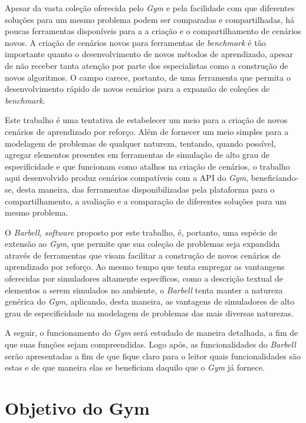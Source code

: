 \documentclass[cic,tc]{iiufrgs}
\begin{document}
Apesar da vasta coleção oferecida pelo \textit{Gym} e pela facilidade com que
diferentes soluções para um mesmo problema podem ser comparadas e
compartilhadas, há poucas ferramentas disponíveis para a a criação e o
compartilhamento de cenários novos. A criação de cenários novos para ferramentas
de \textit{benchmark} é tão importante quanto o desenvolvimento de novos métodos
de aprendizado, apesar de não receber tanta atenção por parte dos especialistas
como a construção de novos algoritmos. O campo carece, portanto, de uma
ferramenta que permita o desenvolvimento rápido de novos cenários para a
expansão de coleções de \textit{benchmark}.


Este trabalho é uma tentativa de estabelecer um meio para a criação de novos
cenários de aprendizado por reforço. Além de fornecer um meio simples para a
modelagem de problemas de qualquer natureza, tentando, quando possível, agregar
elementos presentes em ferramentas de simulação de alto grau de especificidade e
que funcionam como atalhos na criação de cenários, o trabalho aqui desenvolvido
produz cenários compatíveis com a API do \textit{Gym}, beneficiando-se, desta
maneira, das ferramentas disponibilizadas pela plataforma para o
compartilhamento, a avaliação e a comparação de diferentes soluções para um
mesmo problema.


O \textit{Barbell}, \textit{software} proposto por este trabalho, é, portanto,
uma espécie de extensão ao \textit{Gym}, que permite que sua coleção de
problemas seja expandida através de ferramentas que visam facilitar a construção
de novos cenários de aprendizado por reforço. Ao mesmo tempo que tenta empregar
as vantangens oferecidas por simuladores altamente específicos, como a descrição
textual de elementos a serem simulados no ambiente, o \textit{Barbell} tenta
manter a natureza genérica do \textit{Gym}, aplicando, desta maneira, as
vantagens de simuladores de alto grau de especificidade na modelagem de
problemas das mais diversas naturezas.


A seguir, o funcionamento do \textit{Gym} será estudado de maneira detalhada, a
fim de que suas funções sejam compreendidas. Logo após, as funcionalidades do
\textit{Barbell} serão apresentadas a fim de que fique claro para o leitor
quais funcionalidades são estas e de que maneira elas se beneficiam daquilo
que o \textit{Gym} já fornece.



\section{Objetivo do Gym}
\end{document}
